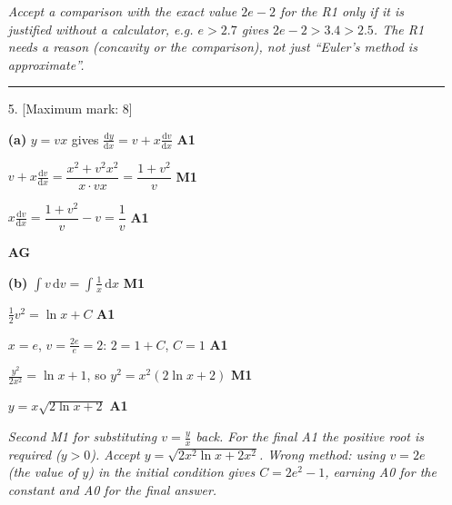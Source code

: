 \documentclass[12pt, twoside]{article}
\begin{document}
\begin{enumerate}[itemsep=0.3cm]
\emph{Accept a comparison with the exact value $2e - 2$ for the R1 only if
it is justified without a calculator, e.g. $e > 2.7$ gives $2e - 2 > 3.4 > 2.5$.
The R1 needs a reason (concavity or the comparison), not just ``Euler's
method is approximate''.}

\bigskip \hrule \bigskip

\item[5.] [Maximum mark: 8]

\textbf{(a)} $y = vx$ gives $\frac{\mathrm{d}y}{\mathrm{d}x} = v + x\frac{\mathrm{d}v}{\mathrm{d}x}$
\hfill \textbf{A1}

$v + x\frac{\mathrm{d}v}{\mathrm{d}x} = \dfrac{x^{2} + v^{2}x^{2}}{x \cdot vx}
= \dfrac{1 + v^{2}}{v}$ \hfill \textbf{M1}

$x\frac{\mathrm{d}v}{\mathrm{d}x} = \dfrac{1 + v^{2}}{v} - v = \dfrac{1}{v}$
\hfill \textbf{A1}

\hfill \textbf{AG}

\textbf{(b)} $\displaystyle\int v\,\mathrm{d}v = \int \frac{1}{x}\,\mathrm{d}x$
\hfill \textbf{M1}

$\frac{1}{2}v^{2} = \ln x + C$ \hfill \textbf{A1}

$x = e$, $v = \frac{2e}{e} = 2$: $2 = 1 + C$, $C = 1$ \hfill \textbf{A1}

$\frac{y^{2}}{2x^{2}} = \ln x + 1$, so $y^{2} = x^{2}\left(2\ln x + 2\right)$
\hfill \textbf{M1}

$y = x\sqrt{2\ln x + 2}$ \hfill \textbf{A1}

\emph{Second M1 for substituting $v = \frac{y}{x}$ back. For the final A1
the positive root is required ($y > 0$). Accept $y = \sqrt{2x^{2}\ln x + 2x^{2}}$.
Wrong method: using $v = 2e$ (the value of $y$) in the initial condition
gives $C = 2e^{2} - 1$, earning A0 for the constant and A0 for the final
answer.}

\end{enumerate}
\end{document}
